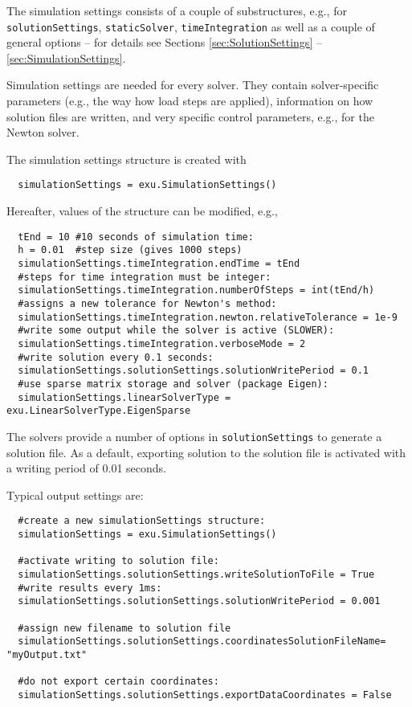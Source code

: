 The simulation settings consists of a couple of substructures, e.g., for \texttt{solutionSettings}, \texttt{staticSolver}, \texttt{timeIntegration} as well as a couple of general options -- for details see Sections \ref{sec:SolutionSettings} -- \ref{sec:SimulationSettings}.

Simulation settings are needed for every solver. They contain solver-specific parameters (e.g., the way how load steps are applied), information on how solution files are written, and very specific control parameters, e.g., for the Newton solver. 

\noindent The simulation settings structure is created with 
\pythonstyle\begin{lstlisting}
  simulationSettings = exu.SimulationSettings()
\end{lstlisting}
%
Hereafter, values of the structure can be modified, e.g.,
\pythonstyle\begin{lstlisting}
  tEnd = 10 #10 seconds of simulation time:
  h = 0.01  #step size (gives 1000 steps)
  simulationSettings.timeIntegration.endTime = tEnd
  #steps for time integration must be integer:
  simulationSettings.timeIntegration.numberOfSteps = int(tEnd/h)
  #assigns a new tolerance for Newton's method:
  simulationSettings.timeIntegration.newton.relativeTolerance = 1e-9 
  #write some output while the solver is active (SLOWER):
  simulationSettings.timeIntegration.verboseMode = 2                 
  #write solution every 0.1 seconds:
  simulationSettings.solutionSettings.solutionWritePeriod = 0.1      
  #use sparse matrix storage and solver (package Eigen):
  simulationSettings.linearSolverType = exu.LinearSolverType.EigenSparse 
\end{lstlisting}

%
The solvers provide a number of options in \texttt{solutionSettings} to generate a solution file. As a default, exporting solution to the solution file is activated with a writing period of 0.01 seconds.

\noindent Typical output settings are:
\pythonstyle\begin{lstlisting}
  #create a new simulationSettings structure:
  simulationSettings = exu.SimulationSettings()
  
  #activate writing to solution file:
  simulationSettings.solutionSettings.writeSolutionToFile = True
  #write results every 1ms:
  simulationSettings.solutionSettings.solutionWritePeriod = 0.001
  
  #assign new filename to solution file
  simulationSettings.solutionSettings.coordinatesSolutionFileName= "myOutput.txt"

  #do not export certain coordinates:
  simulationSettings.solutionSettings.exportDataCoordinates = False
\end{lstlisting}



